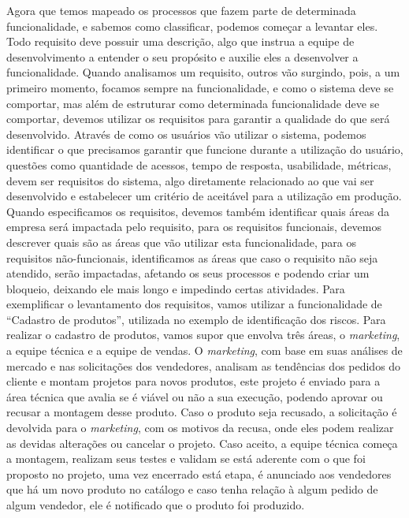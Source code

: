       Agora que temos mapeado os processos que fazem parte de determinada funcionalidade,
      e sabemos como classificar, podemos começar a levantar eles. Todo requisito
      deve possuir uma descrição, algo que instrua a equipe de desenvolvimento a entender
      o seu propósito e auxilie eles a desenvolver a funcionalidade. Quando analisamos
      um requisito, outros vão surgindo, pois, a um primeiro momento, focamos sempre
      na funcionalidade, e como o sistema deve se comportar, mas além de estruturar
      como determinada funcionalidade deve se comportar, devemos utilizar os requisitos
      para garantir a qualidade do que será desenvolvido. Através de como os
      usuários vão utilizar o sistema, podemos identificar o que precisamos
      garantir que funcione durante a utilização do usuário, questões como quantidade
      de acessos, tempo de resposta, usabilidade, métricas, devem ser requisitos
      do sistema, algo diretamente relacionado ao que vai ser desenvolvido e
      estabelecer um critério de aceitável para a utilização em produção.
      Quando especificamos os requisitos, devemos também identificar quais áreas
      da empresa será impactada pelo requisito, para os requisitos funcionais,
      devemos descrever quais são as áreas que vão utilizar esta funcionalidade,
      para os requisitos não-funcionais, identificamos as áreas que caso o requisito
      não seja atendido, serão impactadas, afetando os seus processos e podendo criar
      um bloqueio, deixando ele mais longo e impedindo certas atividades. Para
      exemplificar o levantamento dos requisitos, vamos utilizar a funcionalidade
      de “Cadastro de produtos”, utilizada no exemplo de identificação dos riscos. \newline
      Para realizar o cadastro de produtos, vamos supor que envolva três áreas, o
      \textit{marketing}, a equipe técnica e a equipe de vendas. O \textit{marketing},
      com base em suas análises de mercado e nas solicitações dos vendedores, analisam
      as tendências dos pedidos do cliente e montam projetos para novos produtos,
      este projeto é enviado para a área técnica que avalia se é viável ou não a
      sua execução, podendo aprovar ou recusar a montagem desse produto. Caso o
      produto seja recusado, a solicitação é devolvida para o \textit{marketing},
      com os motivos da recusa, onde eles podem realizar as devidas alterações ou
      cancelar o projeto. Caso aceito, a equipe técnica começa a montagem,
      realizam seus testes e validam se está aderente com o que foi proposto no
      projeto, uma vez encerrado está etapa, é anunciado aos vendedores que há um
      novo produto no catálogo e caso tenha relação à algum pedido de algum vendedor,
      ele é notificado que o produto foi produzido. \newline

